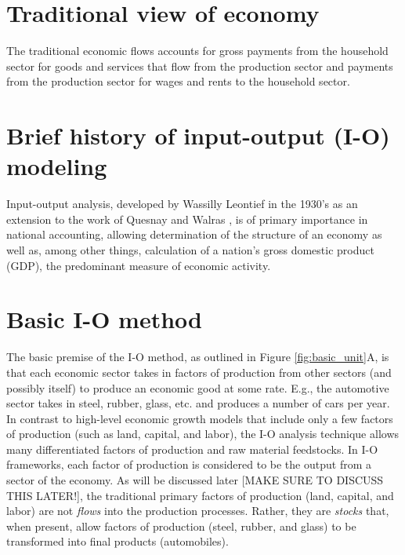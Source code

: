 \section{Traditional view of economy}

The traditional economic flows accounts for gross payments from the household sector for goods and services that flow from the production sector and payments from the production sector for wages and rents to the household sector.

\section{Brief history of input-output (I-O) modeling}

Input-output analysis, developed by Wassilly Leontief in the 1930's as an extension to the work of Quesnay and Walras \cite{Leontief1936}, is of primary importance in national accounting, allowing determination of the structure of an economy as well as, among other things, calculation of a nation's gross domestic product (GDP), the predominant measure of economic activity.

\section{Basic I-O method}

The basic premise of the I-O method, as outlined in Figure \ref{fig:basic_unit}A, is that each economic sector takes in factors of production from other sectors (and possibly itself) to produce an economic good at some rate. E.g., the automotive sector takes in steel, rubber, glass, etc. and produces a number of cars per year. In contrast to high-level economic growth models that include only a few factors of production (such as land, capital, and labor), the I-O analysis technique allows many differentiated factors of production and raw material feedstocks. \cite{Costanza1980} In I-O frameworks, each factor of production is considered to be the output from a sector of the economy. As will be discussed later [MAKE SURE TO DISCUSS THIS LATER!], the traditional primary factors of production (land, capital, and labor) are not \emph{flows} into the production processes. Rather, they are \emph{stocks} that, when present, allow factors of production (steel, rubber, and glass) to be transformed into final products (automobiles).

